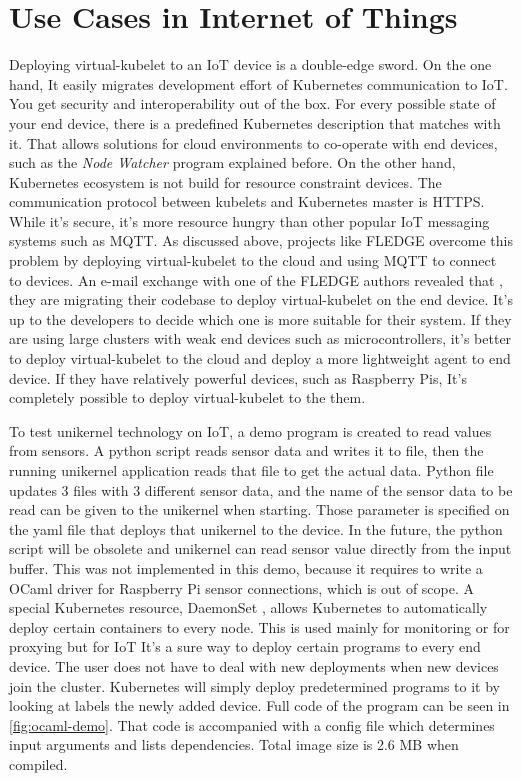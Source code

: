 \section{Use Cases in Internet of Things}

Deploying virtual-kubelet to an IoT device is a double-edge sword. On the one hand, It easily migrates development effort of Kubernetes communication to IoT. You get security and interoperability out of the box. For every possible state of your end device, there is a predefined Kubernetes description that matches with it. That allows solutions for cloud environments to co-operate with end devices, such as the \textit{Node Watcher} program explained before. On the other hand, Kubernetes ecosystem is not build for resource constraint devices. The communication protocol between kubelets and Kubernetes master is HTTPS. While it's secure, it's more resource hungry than other popular IoT messaging systems such as MQTT. As discussed above, projects like FLEDGE overcome this problem by deploying virtual-kubelet to the cloud and using MQTT to connect to devices. An e-mail exchange with one of the FLEDGE authors revealed that , they are migrating their codebase to deploy virtual-kubelet on the end device. It's up to the developers to decide which one is more suitable for their system. If they are using large clusters with weak end devices such as microcontrollers, it's better to deploy virtual-kubelet to the cloud and deploy a more lightweight agent to end device. If they have relatively powerful devices, such as Raspberry Pis, It's completely possible to deploy virtual-kubelet to the them.

To test unikernel technology on IoT, a demo program is created to read values from sensors. A python script reads sensor data and writes it to file, then the running unikernel application reads that file to get the actual data. Python file updates 3 files with 3 different sensor data, and the name of the sensor data to be read can be given to the unikernel when starting. Those parameter is specified on the yaml file that deploys that unikernel to the device. In the future, the python script will be obsolete and unikernel can read sensor value directly from the input buffer. This was not implemented in this demo, because it requires to write a OCaml driver for Raspberry Pi sensor connections, which is out of scope. A special Kubernetes resource, DaemonSet , allows Kubernetes to automatically deploy certain containers to every node. This is used mainly for monitoring or for proxying but for IoT It's a sure way to deploy certain programs to every end device. The user does not have to deal with new deployments when new devices join the cluster. Kubernetes will simply deploy predetermined programs to it by looking at labels the newly added device. Full code of the program can be seen in \ref{fig:ocaml-demo}. That code is accompanied with a config file which determines input arguments and lists dependencies. Total image size is 2.6 MB when compiled.

